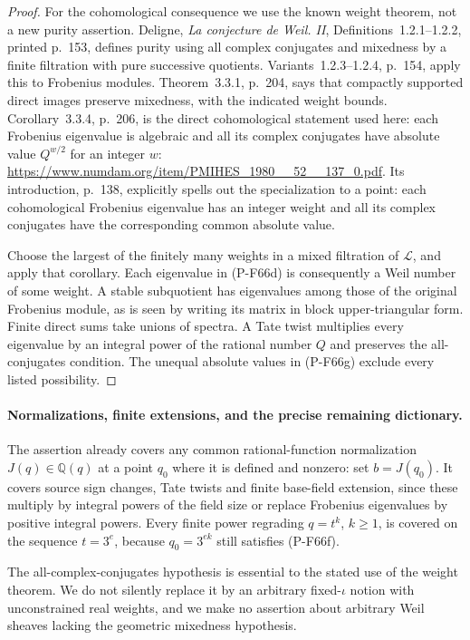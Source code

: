 \begin{proof}
For the cohomological consequence we use the known
weight theorem, not a new purity assertion.  Deligne,
\emph{La conjecture de Weil. II}, Definitions~1.2.1--1.2.2,
printed p.~153, defines purity using all complex
conjugates and mixedness by a finite filtration with
pure successive quotients.  Variants~1.2.3--1.2.4,
p.~154, apply this to Frobenius modules.  Theorem~3.3.1,
p.~204, says that compactly supported direct images
preserve mixedness, with the indicated weight bounds.
Corollary~3.3.4, p.~206, is the direct cohomological
statement used here: each Frobenius eigenvalue is algebraic
and all its complex conjugates have absolute value
$Q^{w/2}$ for an integer $w$:
\url{https://www.numdam.org/item/PMIHES_1980__52__137_0.pdf}.
Its introduction, p.~138, explicitly spells out the
specialization to a point: each cohomological
Frobenius eigenvalue has an integer weight and all
its complex conjugates have the corresponding common
absolute value.

Choose the largest of the finitely many weights in a mixed
filtration of $\mathcal L$, and apply that corollary.
Each eigenvalue in (P-F66d) is consequently a Weil number
of some weight.  A stable subquotient has eigenvalues
among those of the original Frobenius module, as is
seen by writing its matrix in block upper-triangular
form.  Finite direct sums take unions of spectra.
A Tate twist multiplies every eigenvalue by an integral
power of the rational number $Q$ and preserves the
all-conjugates condition.  The unequal absolute values
in (P-F66g) exclude every listed possibility.
\end{proof}

\paragraph{Normalizations, finite extensions, and the precise remaining dictionary.}
The assertion already covers any common rational-function
normalization $J(q)\in\mathbb Q(q)$ at a point $q_0$ where
it is defined and nonzero: set $b=J(q_0)$.
It covers source sign changes, Tate twists and finite
base-field extension, since these multiply by integral
powers of the field size or replace Frobenius eigenvalues
by positive integral powers.  Every finite power regrading
$q=t^k$, $k\ge1$, is covered on the sequence $t=3^e$, because
$q_0=3^{ek}$ still satisfies (P-F66f).

The all-complex-conjugates hypothesis is essential to the
stated use of the weight theorem.  We do not silently replace
it by an arbitrary fixed-$\iota$ notion with unconstrained
real weights, and we make no assertion about arbitrary
Weil sheaves lacking the geometric mixedness hypothesis.

